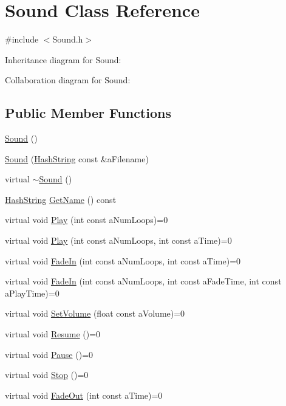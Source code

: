 \hypertarget{classSound}{}\section{Sound Class Reference}
\label{classSound}


{\ttfamily \#include $<$Sound.\+h$>$}



Inheritance diagram for Sound\+:


Collaboration diagram for Sound\+:
\subsection*{Public Member Functions}
\begin{DoxyCompactItemize}
\item 
\hyperlink{classSound_a539c205cdf06fe2c621fd77c37bcfac9}{Sound} ()
\item 
\hyperlink{classSound_ab38dc8250e7f9560478813bb6ae13937}{Sound} (\hyperlink{classHashString}{Hash\+String} const \&a\+Filename)
\item 
virtual \hyperlink{classSound_a0907389078bf740be2a5763366ad3376}{$\sim$\+Sound} ()
\item 
\hyperlink{classHashString}{Hash\+String} \hyperlink{classSound_a5c8fe18c589ea28d68db6be0426b011b}{Get\+Name} () const 
\item 
virtual void \hyperlink{classSound_a3e5b7d409008b46c519cca2a3f0cec0f}{Play} (int const a\+Num\+Loops)=0
\item 
virtual void \hyperlink{classSound_adc03627f456e7d3a547a2049d9a4b0e2}{Play} (int const a\+Num\+Loops, int const a\+Time)=0
\item 
virtual void \hyperlink{classSound_a8d7717ebd87d045f4c52f042c0efb327}{Fade\+In} (int const a\+Num\+Loops, int const a\+Time)=0
\item 
virtual void \hyperlink{classSound_af9a7823b629a12c2b7eae07a0710185b}{Fade\+In} (int const a\+Num\+Loops, int const a\+Fade\+Time, int const a\+Play\+Time)=0
\item 
virtual void \hyperlink{classSound_a04a6510dfdf83a6bcc7e9b954e3ef3f1}{Set\+Volume} (float const a\+Volume)=0
\item 
virtual void \hyperlink{classSound_ac5329f4a5db0fd806b97cace31ed09fc}{Resume} ()=0
\item 
virtual void \hyperlink{classSound_ad895dba3c3772b435d3d37f8460bc426}{Pause} ()=0
\item 
virtual void \hyperlink{classSound_a4a3ed0b6117f79c60584ef93d5b7b94b}{Stop} ()=0
\item 
virtual void \hyperlink{classSound_a03bc004f545746a7bdd294d15305d44a}{Fade\+Out} (int const a\+Time)=0
\end{DoxyCompactItemize}

